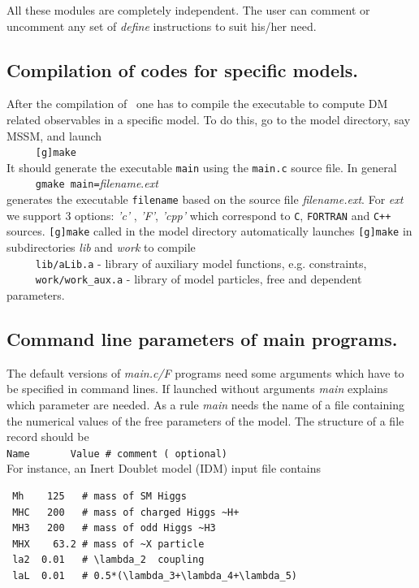 \documentclass[12pt,a4paper]{article}
\begin{document}
All these modules are completely independent. The user can comment or
uncomment any set of {\it define} instructions to suit his/her need. 

\subsection{Compilation of codes for specific models.}
 After the compilation of \micro\ one has to compile
the executable to compute DM related observables in a specific model. To
do this, go to the model directory, say MSSM,  and launch\\

\verb|     [g]make|\\
It should generate the executable {\tt main} using the {\tt main.c} source file. In
general\\

\verb|     gmake main=|{\it filename}.{\it ext}\\ 
generates the executable {\tt filename}  based on the source file {\it
filename.ext}.
For {\it ext}  we support 3 options: {\it 'c'} , {\it 'F'}, {\it 'cpp'} which correspond to
{\tt C}, {\tt FORTRAN} and {\tt C++} sources.
{\tt [g]make} called  in the model directory automatically  launches {\tt [g]make}
in subdirectories {\it lib} and {\it work} to compile \\
 \verb|     lib/aLib.a|   - library of auxiliary model functions, e.g. constraints,\\
 \verb|     work/work_aux.a| - library of model particles, free and dependent parameters.\\

\subsection{Command line parameters of main programs.}
\label{sec:command}
The default versions of {\it main.c/F}  programs need some arguments
which have to be specified in command lines. If launched without
arguments {\it main} explains which parameter are needed. 
As a rule  {\it main}  needs  the name of a file containing the
numerical values of the free parameters of the model. The structure of a file
record should be\\
\verb|Name       Value # comment ( optional)|\\
For instance, an Inert Doublet model (IDM) input file contains
\begin{verbatim}
 Mh    125   # mass of SM Higgs 
 MHC   200   # mass of charged Higgs ~H+
 MH3   200   # mass of odd Higgs ~H3
 MHX    63.2 # mass of ~X particle
 la2  0.01   # \lambda_2  coupling
 laL  0.01   # 0.5*(\lambda_3+\lambda_4+\lambda_5)
\end{verbatim}
\end{document}
